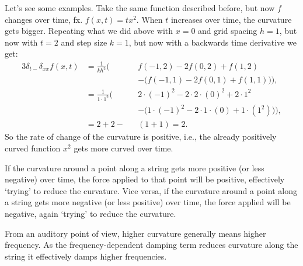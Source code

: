 Let's see some examples. Take the same function described before, but now $f$ changes over time, fx. $f(x, t)=tx^2$. When $t$ increases over time, the curvature gets bigger. Repeating what we did above with $x=0$ and grid spacing $h = 1$, but now with $t=2$ and step size $k=1$, but now with a backwards time derivative we get:
  \begin{alignat*}{3}
    \delta_{t-}\delta_{xx}f(x,t) &= \frac{1}{kh^2}\bigg(&&f(-1, 2) - 2f(0, 2) + f(1, 2) \\
    & &&- \Big(f(-1, 1) - 2f(0, 1) + f(1, 1)\Big)\bigg),\\
    & = \frac{1}{1\cdot 1^2}\bigg(&&2\cdot(-1)^2-2\cdot2\cdot(0)^2+2\cdot1^2\\
    & &&-\Big(1\cdot(-1)^2-2\cdot1\cdot(0)+1\cdot(1^2)\Big)\Bigg),\\
    &=2+2-&&(1+1)=2.
  \end{alignat*}
So the rate of change of the curvature is positive, i.e., the already positively curved function $x^2$ gets more curved over time.

If the curvature around a point along a string gets more positive (or less negative) over time, the force applied to that point will be positive, effectively `trying' to reduce the curvature. Vice versa, if the curvature around a point along a string gets more negative (or less positive) over time, the force applied will be negative, again `trying' to reduce the curvature. 

From an auditory point of view, higher curvature generally means higher frequency. As the frequency-dependent damping term reduces curvature along the string it effectively damps higher frequencies.
 
